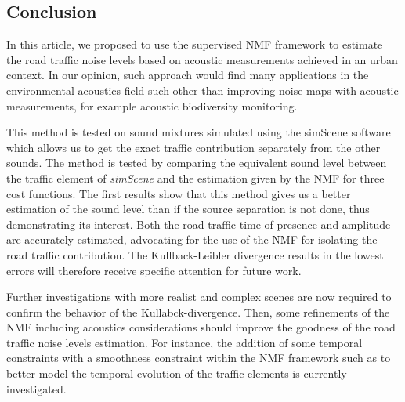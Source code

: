 \documentclass{article}
\begin{document}
\begin{sloppy}
\section{Conclusion}

In this article, we proposed to use the supervised NMF framework to estimate the road traffic noise levels based on acoustic measurements achieved in an urban context. In our opinion, such approach would find many applications in the environmental acoustics field such other than improving noise maps with acoustic measurements, for example acoustic biodiversity monitoring. 


This method is tested on sound mixtures simulated using the simScene software which allows us to get the exact traffic contribution separately from the other sounds. The method is tested by comparing the equivalent sound level between the traffic element of \textit{simScene} and the estimation given by the NMF for three cost functions. The first results show that this method gives us a better estimation of the sound level than if the source separation is not done, thus demonstrating its interest. Both the road traffic time of presence and amplitude are accurately estimated, advocating for the use of the NMF for isolating the road traffic contribution. The Kullback-Leibler divergence results in the lowest errors will therefore receive specific attention for future work. 

Further investigations with more realist and complex scenes are now required to confirm the behavior of the Kullabck-divergence. Then, some refinements of the NMF including acoustics considerations should improve the goodness of the road traffic noise levels estimation. For instance, the addition of some temporal constraints with a smoothness constraint within the NMF framework such as \cite{fevotteSmooth} \cite{Essid} \cite{virtanenSmooth} to better model the temporal evolution of the traffic elements is currently investigated.






\end{sloppy}
\end{document}
